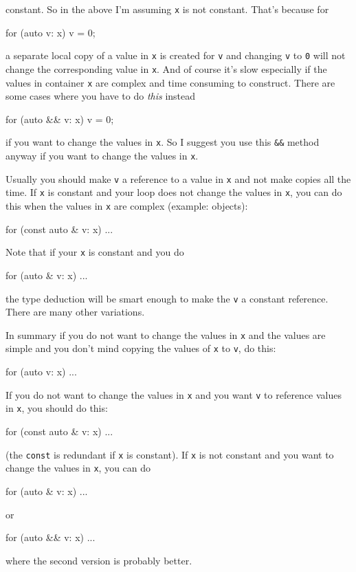 constant.
So in the above I'm assuming \verb!x! is not constant.
That's because for
\begin{console}[fontsize=\footnotesize]
for (auto v: x)
{
    v = 0;
}
\end{console}
a separate local copy of a value in \verb!x! is created for \verb!v!
and changing \verb!v! to \verb!0! will not
change the corresponding value in \verb!x!.
And of course it's
slow especially if the values in container \verb!x! are complex
and time consuming to construct.
There are some cases where you have to do \textit{this} instead\tinysidebar{\texttt{\&\&}}
\begin{console}[fontsize=\footnotesize]
for (auto && v: x)
{
    v = 0;
}
\end{console}
if you want to change the values in \verb!x!.
So I suggest you use this \verb!&&! method anyway
if you want to change the values in \verb!x!.

Usually you should make \verb!v! a reference to a value in \verb!x!
and not make copies all the time.
If \verb!x! is constant and your loop does not change the values in \verb!x!,
you can do this when the values in \verb!x! are complex (example: objects):
\begin{console}[fontsize=\footnotesize]
for (const auto & v: x)
{
    ...
}
\end{console}
Note that if your \verb!x! is constant and you do
\begin{console}[fontsize=\footnotesize]
for (auto & v: x)
{
    ...
}
\end{console}
the type deduction will be smart
enough to make the \verb!v! a constant reference.
There are many other variations.

In summary if you do not want to change the values in \verb!x!
and the values are simple and you don't mind copying
the values of \verb!x! to \verb!v!, do this:
\begin{console}[fontsize=\footnotesize]
for (auto v: x)
{
    ...
}
\end{console}
If you do not want to change the values in \verb!x!
and you want \verb!v! to reference values in \verb!x!, you should do this:
\begin{console}[fontsize=\footnotesize]
for (const auto & v: x)
{
    ...
}
\end{console}
(the \verb!const! is redundant if \verb!x! is constant).
If \verb!x! is not constant and you want to change the
values in \verb!x!, you can do
\begin{console}[fontsize=\footnotesize]
for (auto & v: x)
{
    ...
}
\end{console}
or
\begin{console}[fontsize=\footnotesize]
for (auto && v: x)
{
    ...
}
\end{console}
where the second version is probably better.

